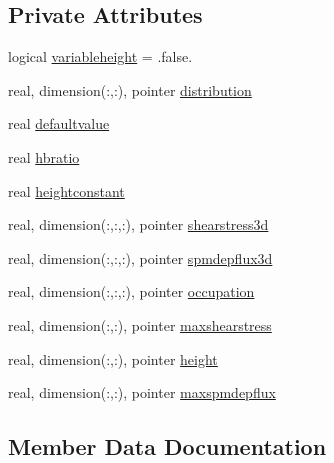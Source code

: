 \subsection*{Private Attributes}
\begin{DoxyCompactItemize}
\item 
logical \mbox{\hyperlink{structmodulewaterproperties_1_1t__macroalgae_a7c15bb9847a5a95634ca2cb94bc3ba66}{variableheight}} = .false.
\item 
real, dimension(\+:,\+:), pointer \mbox{\hyperlink{structmodulewaterproperties_1_1t__macroalgae_a0cafd1126fbb441f3a80b1b04231b6eb}{distribution}}
\item 
real \mbox{\hyperlink{structmodulewaterproperties_1_1t__macroalgae_aa677adec77fcbf0216544eeb2fa87b1c}{defaultvalue}}
\item 
real \mbox{\hyperlink{structmodulewaterproperties_1_1t__macroalgae_a3a6e3fdd40714343e21a2a3ed6c0f64b}{hbratio}}
\item 
real \mbox{\hyperlink{structmodulewaterproperties_1_1t__macroalgae_a30eb28561ed1c29ec3f4741eb574c46d}{heightconstant}}
\item 
real, dimension(\+:,\+:,\+:), pointer \mbox{\hyperlink{structmodulewaterproperties_1_1t__macroalgae_a56c3a5c39d01ea02d2071132d454f489}{shearstress3d}}
\item 
real, dimension(\+:,\+:,\+:), pointer \mbox{\hyperlink{structmodulewaterproperties_1_1t__macroalgae_ab1ff4a2850c2a74282dab1499317363b}{spmdepflux3d}}
\item 
real, dimension(\+:,\+:,\+:), pointer \mbox{\hyperlink{structmodulewaterproperties_1_1t__macroalgae_af6e5206786fd4114df6d80d94b78b5ed}{occupation}}
\item 
real, dimension(\+:,\+:), pointer \mbox{\hyperlink{structmodulewaterproperties_1_1t__macroalgae_ae385011d448a0b52b08739bfd917e501}{maxshearstress}}
\item 
real, dimension(\+:,\+:), pointer \mbox{\hyperlink{structmodulewaterproperties_1_1t__macroalgae_a44d324f47bafe9b4e28813a3cdf638cb}{height}}
\item 
real, dimension(\+:,\+:), pointer \mbox{\hyperlink{structmodulewaterproperties_1_1t__macroalgae_af9f02fee68f71d9a6edeaf0ca6b3c1dd}{maxspmdepflux}}
\end{DoxyCompactItemize}


\subsection{Member Data Documentation}
\mbox{\label{structmodulewaterproperties_1_1t__macroalgae_aa677adec77fcbf0216544eeb2fa87b1c}} 
